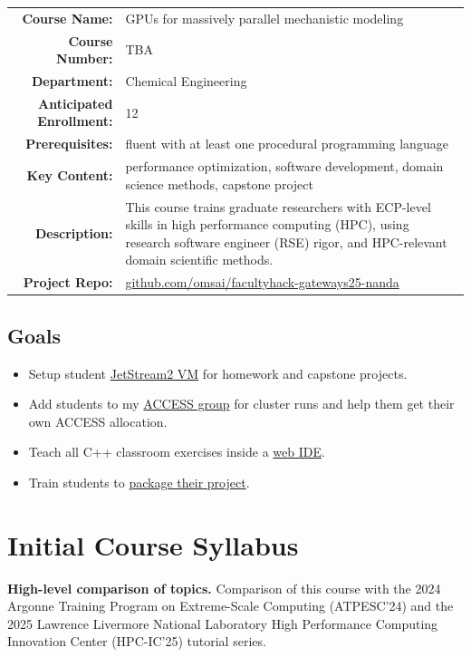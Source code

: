 \documentclass[
portrait,
custom
]{sciposter}
\begin{document}
\begin{multicols}{2}
  {
    \begin{tabularx}{\linewidth}{>{\bfseries}r X}
      \toprule
      Course Name:
      & GPUs for massively parallel mechanistic modeling\\
      Course Number:
      & TBA\\
      Department:
      & Chemical Engineering\\
      Anticipated Enrollment:
      & 12\\
      Prerequisites:
      & fluent with at least one %
      procedural programming language\\
      Key Content:
      & performance optimization, %
      software development, %
      domain science methods, %
      capstone project\\
      Description:
      & This course trains graduate researchers %
      with ECP-level skills in high performance computing (HPC), %
      using research software engineer (RSE) rigor, %
      and HPC-relevant domain scientific methods.\\
      Project Repo:
      & \small \url{github.com/omsai/facultyhack-gateways25-nanda}\\
      \bottomrule
    \end{tabularx}
    \medskip
  }

  \subsection*{Goals}
  \begin{itemize}
  \item Setup student \ul{JetStream2 VM} for homework and capstone projects.
  \item Add students to my \ul{ACCESS group} for cluster runs and %
    help them get their own ACCESS allocation.
  \item Teach all C++ classroom exercises inside a \ul{web IDE}. 
  \item Train students to \ul{package their project}.
  \end{itemize}

  \section*{Initial Course Syllabus}
    \textbf{High-level comparison of topics.}
        Comparison of this course with the %
        2024 Argonne Training Program on Extreme-Scale Computing (ATPESC'24) %
        and the 2025 Lawrence Livermore National Laboratory %
        High Performance Computing Innovation Center (HPC-IC'25) %
        tutorial series.
        \medskip


\end{multicols}
\end{document}
